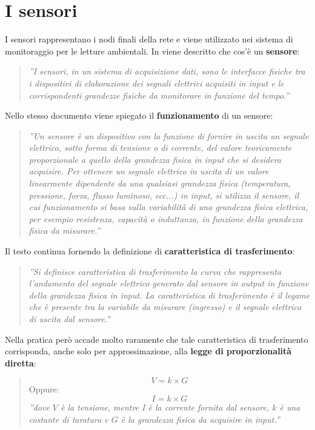 \documentclass[a4paper]{report} %
\begin{document}
\section{I sensori}
I sensori rappresentano i nodi finali della rete e viene utilizzato nei sistema di monitoraggio per le letture ambientali.
In \cite{art:rif.1} viene descritto che cos'è un \textbf{sensore}:
\begin{quote}
	\textit{''I sensori, in un sistema di acquisizione dati, sono le interfacce fisiche tra i dispositivi di elaborazione dei segnali elettrici acquisiti in input e le corrispondenti grandezze fisiche da monitorare in funzione del tempo.''}
\end{quote} 
Nello stesso documento viene spiegato il \textbf{funzionamento} di un sensore:
\begin{quote}
	\textit{''Un sensore è un dispositivo con la funzione di fornire in uscita un segnale elettrico, sotto forma di tensione o di corrente, del valore teoricamente proporzionale a quello della grandezza fisica in input che si desidera acquisire. 	
	Per ottenere un segnale elettrico in uscita di un valore linearmente dipendente da una qualsiasi grandezza fisica (temperatura, pressione, forza, flusso luminoso, ecc...) in input, si utilizza il sensore, il cui funzionamento si basa sulla variabilità di una grandezza fisica elettrica, per esempio resistenza, capacità o induttanza, in funzione della grandezza fisica da misurare.''}
\end{quote}
Il testo continua fornendo la definizione di \textbf{caratteristica di trasferimento}:	
\begin{quote}
	\textit{''Si definisce caratteristica di trasferimento la curva che rappresenta l'andamento del segnale elettrico generato dal sensore in output in funzione della grandezza fisica in input.
	La caratteristica di trasferimento è il legame che è presente tra la variabile da misurare (ingresso) e il segnale elettrico di uscita dal sensore.''}
\end{quote}
Nella pratica però accade molto raramente che tale caratteristica di trasferimento corrisponda, anche solo per approssimazione, alla \textbf{legge di proporzionalità diretta}: 
\begin{quote}
	\begin{equation}
	V = k \times G
	\end{equation}
	Oppure:
	\begin{equation}
	I = k \times G
	\end{equation}
	\textit{''dove $V$ è la tensione, mentre I è la corrente fornita dal sensore, $k$ è una costante di taratura e $G$ è la grandezza fisica da acquisire in input.''} 
\end{quote} 
\end{document}
